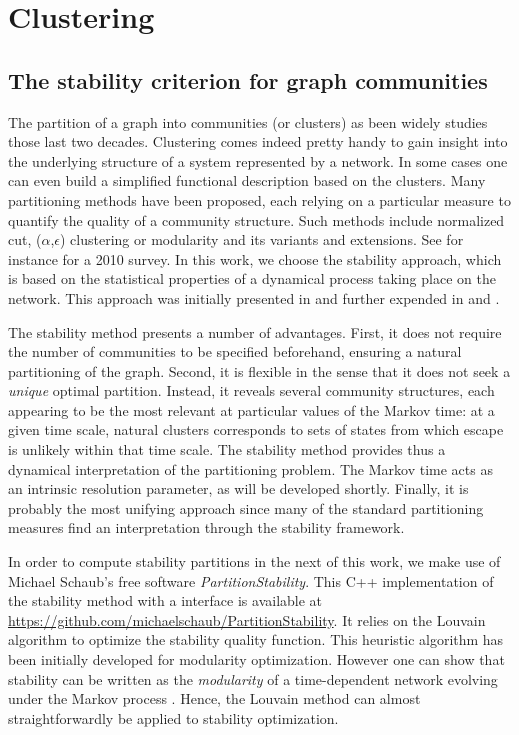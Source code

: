 \chapter{Clustering}
\section{The stability criterion for graph communities} \label{sec:stability}
The partition of a graph into communities (or clusters) as been widely studies those last two decades. Clustering comes indeed pretty handy to gain insight into the underlying structure of a system represented by a network. In some cases one can even build a simplified functional description based on the clusters. Many partitioning methods have been proposed, each relying on a particular measure to quantify the quality of a community structure. Such methods include normalized cut, ($\alpha$,$\epsilon$) clustering or modularity and its variants and extensions. See for instance \cite{fortunato2010community} for a 2010 survey. In this work, we choose the stability approach, which is based on the statistical properties of a dynamical process taking place on the network. This approach was initially presented in \cite{delvenne2010stability} and further expended in \cite{lambiotte2009laplacian} and \cite{delvenne2013stability}. 

The stability method presents a number of advantages. First, it does not require the number of communities to be specified beforehand, ensuring a natural partitioning of the graph. Second, it is flexible in the sense that it does not seek a \textit{unique} optimal partition. Instead, it reveals several community structures, each appearing to be the most relevant at particular values of the Markov time: at a given time scale, natural clusters corresponds to sets of states from which escape is unlikely within that time scale. The stability method provides thus a dynamical interpretation of the partitioning problem. The Markov time acts as an intrinsic resolution parameter, as will be developed shortly. Finally, it is probably the most unifying approach since many of the standard partitioning measures find an interpretation through the stability framework.

In order to compute stability partitions in the next of this work, we make use of Michael Schaub's free software \textit{PartitionStability}. This C++ implementation of the stability method with a \matlab interface is available at \url{https://github.com/michaelschaub/PartitionStability}. It relies on the Louvain algorithm \cite{blondel2008fast} to optimize the stability quality function. This heuristic algorithm has been initially developed for modularity optimization. However one can show that stability can be written as the \textit{modularity} of a time-dependent network evolving under the Markov process \cite{lambiotte2009laplacian}. Hence, the Louvain method can almost straightforwardly be applied to stability optimization.

